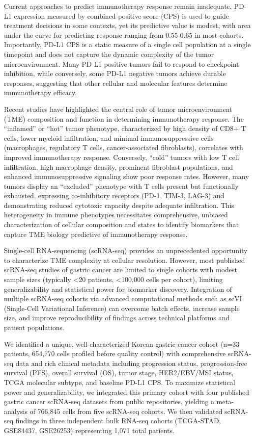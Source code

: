 \documentclass[12pt,twoside]{article}
\begin{document}
Current approaches to predict immunotherapy response remain inadequate. PD-L1 expression measured by combined positive score (CPS) is used to guide treatment decisions in some contexts, yet its predictive value is modest, with area under the curve for predicting response ranging from 0.55-0.65 in most cohorts. Importantly, PD-L1 CPS is a static measure of a single cell population at a single timepoint and does not capture the dynamic complexity of the tumor microenvironment. Many PD-L1 positive tumors fail to respond to checkpoint inhibition, while conversely, some PD-L1 negative tumors achieve durable responses, suggesting that other cellular and molecular features determine immunotherapy efficacy.

Recent studies have highlighted the central role of tumor microenvironment (TME) composition and function in determining immunotherapy response. The ``inflamed'' or ``hot'' tumor phenotype, characterized by high density of CD8+ T cells, lower myeloid infiltration, and minimal immunosuppressive cells (macrophages, regulatory T cells, cancer-associated fibroblasts), correlates with improved immunotherapy response. Conversely, ``cold'' tumors with low T cell infiltration, high macrophage density, prominent fibroblast populations, and enhanced immunosuppressive signaling show poor response rates. However, many tumors display an ``excluded'' phenotype with T cells present but functionally exhausted, expressing co-inhibitory receptors (PD-1, TIM-3, LAG-3) and demonstrating reduced cytotoxic capacity despite adequate infiltration. This heterogeneity in immune phenotypes necessitates comprehensive, unbiased characterization of cellular composition and states to identify biomarkers that capture TME biology predictive of immunotherapy response.

Single-cell RNA-sequencing (scRNA-seq) provides an unprecedented opportunity to characterize TME complexity at cellular resolution. However, most published scRNA-seq studies of gastric cancer are limited to single cohorts with modest sample sizes (typically <20 patients, <100,000 cells per cohort), limiting generalizability and statistical power for biomarker discovery. Integration of multiple scRNA-seq cohorts via advanced computational methods such as scVI (Single-Cell Variational Inference) can overcome batch effects, increase sample size, and improve reproducibility of findings across technical platforms and patient populations.

We identified a unique, well-characterized Korean gastric cancer cohort (n=33 patients, 654,770 cells profiled before quality control) with comprehensive scRNA-seq data and rich clinical metadata including progression status, progression-free survival (PFS), overall survival (OS), tumor stage, HER2/EBV/MSI status, TCGA molecular subtype, and baseline PD-L1 CPS. To maximize statistical power and generalizability, we integrated this primary cohort with four published gastric cancer scRNA-seq datasets from public repositories, yielding a meta-analysis of 766,845 cells from five scRNA-seq cohorts. We then validated scRNA-seq findings in three independent bulk RNA-seq cohorts (TCGA-STAD, GSE84437, GSE26253) representing 1,071 total patients.
\end{document}
